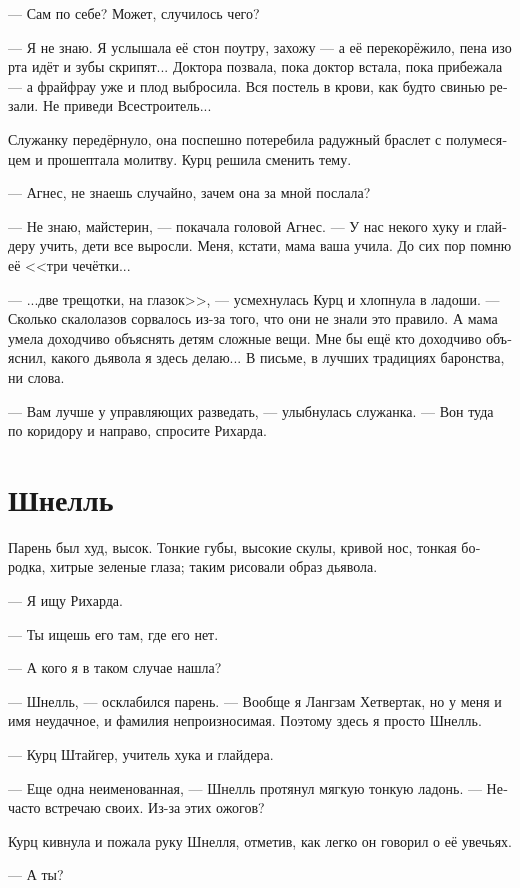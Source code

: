 \documentclass[a4paper,10pt,fleqn]{book}\usepackage{polyglossia}\setdefaultlanguage[babelshorthands=true]{russian}\setotherlanguage{english}\defaultfontfeatures{Ligatures=TeX,Mapping=tex-text}\usepackage{xcolor}\newcommand{\ml}[3]{#2}
\begin{document}
--- Сам по себе?
\ml{$0$}
{Может, случилось чего?}
{Maybe, something's happened?''}

--- Я не знаю.
Я услышала её стон поутру, захожу --- а её перекорёжило, пена изо рта идёт и зубы скрипят...
Доктора позвала, пока доктор встала, пока прибежала --- а фрайфрау уже и плод выбросила.
Вся постель в крови, как будто свинью резали.
Не приведи Всестроитель...

Служанку передёрнуло, она поспешно потеребила радужный браслет с полумесяцем и прошептала молитву.
Курц решила сменить тему.

--- Агнес, не знаешь случайно, зачем она за мной послала?

--- Не знаю, майстерин, --- покачала головой Агнес.
--- У нас некого хуку и глайдеру учить, дети все выросли.
Меня, кстати, мама ваша учила.
До сих пор помню её <<три чечётки...

--- ...две трещотки, на глазок>>, --- усмехнулась Курц и хлопнула в ладоши.
--- Сколько скалолазов сорвалось из-за того, что они не знали это правило.
А мама умела доходчиво объяснять детям сложные вещи.
Мне бы ещё кто доходчиво объяснил, какого дьявола я здесь делаю...
В письме, в лучших традициях баронства, ни слова.

--- Вам лучше у управляющих разведать, --- улыбнулась служанка.
--- Вон туда по коридору и направо, спросите Рихарда.

\section{Шнелль}

Парень был худ, высок.
Тонкие губы, высокие скулы, кривой нос, тонкая бородка, хитрые зеленые глаза;
таким рисовали образ дьявола.

--- Я ищу Рихарда.

--- Ты ищешь его там, где его нет.

--- А кого я в таком случае нашла?

--- Шнелль, --- осклабился парень.
--- Вообще я Лангзам Хетвертак, но у меня и имя неудачное, и фамилия непроизносимая.
Поэтому здесь я просто Шнелль.

--- Курц Штайгер, учитель хука и глайдера.

--- Еще одна неименованная, --- Шнелль протянул мягкую тонкую ладонь.
--- Нечасто встречаю своих.
Из-за этих ожогов?

Курц кивнула и пожала руку Шнелля, отметив, как легко он говорил о её увечьях.

--- А ты?
\end{document}
